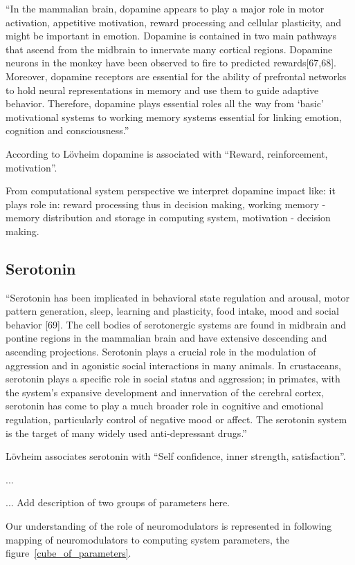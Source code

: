 ``In the mammalian brain, dopamine appears to play a major role in motor activation, appetitive motivation, reward processing and
cellular plasticity, and might be important in emotion. Dopamine is contained in two main pathways that ascend from the midbrain to
innervate many cortical regions. Dopamine neurons in the monkey have been observed to fire to predicted rewards[67,68]. Moreover,
dopamine receptors are essential for the ability of prefrontal networks to hold neural representations in memory and use them
to guide adaptive behavior. Therefore, dopamine plays essential roles all the way from ‘basic’ motivational systems to working
memory systems essential for linking emotion, cognition and consciousness.''

According to L\"{o}vheim \cite{cubeofemotions} dopamine is associated with ``Reward, reinforcement, motivation''.

From computational system perspective we interpret dopamine impact like: it plays role in: reward processing thus in decision making, working memory - memory distribution and storage in computing system, motivation - decision making.

\subsection{Serotonin}

``Serotonin has been implicated in behavioral state regulation and arousal, motor pattern generation, sleep, learning and plasticity, food intake, mood and social behavior [69]. The cell bodies of serotonergic systems are found in midbrain and pontine regions in the mammalian brain and have extensive descending and ascending projections. Serotonin plays a crucial role in the modulation of aggression and in agonistic social interactions in many animals. In crustaceans, serotonin plays a specific role in social status and aggression; in primates, with the system’s expansive development and innervation of the cerebral cortex, serotonin has come to play a much broader role in cognitive and emotional regulation, particularly control of negative mood or affect. The serotonin system is the target of many widely used anti-depressant drugs.''

L\"{o}vheim associates serotonin with ``Self confidence, inner strength, satisfaction''.

...

... Add description of two groups of parameters here.

Our understanding of the role of neuromodulators  is represented in following mapping of neuromodulators to computing system parameters, the figure~\ref{cube_of_parameters}.

